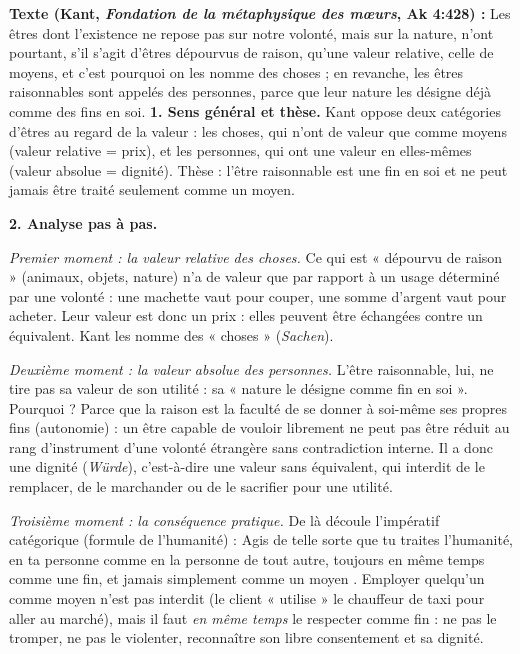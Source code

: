 \documentclass[11pt]{article}
\newcommand{\cle}[1]{{\popxbold\color{popdark}#1}}
\begin{document}
\begin{exoresolu}
\textbf{Texte (Kant, \emph{Fondation de la métaphysique des mœurs}, Ak 4:428) :} \guillemotleft Les êtres dont l'existence ne repose pas sur notre volonté, mais sur la nature, n'ont pourtant, s'il s'agit d'êtres dépourvus de raison, qu'une valeur relative, celle de moyens, et c'est pourquoi on les nomme des choses ; en revanche, les êtres raisonnables sont appelés des personnes, parce que leur nature les désigne déjà comme des fins en soi. \guillemotright
\tcblower
\textbf{1. Sens général et thèse.} Kant oppose deux catégories d'êtres au regard de la valeur : les choses, qui n'ont de valeur que comme moyens (valeur relative = prix), et les personnes, qui ont une valeur en elles-mêmes (valeur absolue = dignité). Thèse : l'être raisonnable est une fin en soi et ne peut jamais être traité seulement comme un moyen.

\textbf{2. Analyse pas à pas.}

\emph{Premier moment : la valeur relative des choses.} Ce qui est « dépourvu de raison » (animaux, objets, nature) n'a de valeur que par rapport à un usage déterminé par une volonté : une machette vaut pour couper, une somme d'argent vaut pour acheter. Leur valeur est donc un \cle{prix} : elles peuvent être échangées contre un équivalent. Kant les nomme des « choses » (\emph{Sachen}).

\emph{Deuxième moment : la valeur absolue des personnes.} L'être raisonnable, lui, ne tire pas sa valeur de son utilité : sa « nature le désigne comme fin en soi ». Pourquoi ? Parce que la raison est la faculté de se donner à soi-même ses propres fins (autonomie) : un être capable de vouloir librement ne peut pas être réduit au rang d'instrument d'une volonté étrangère sans contradiction interne. Il a donc une \cle{dignité} (\emph{Würde}), c'est-à-dire une valeur sans équivalent, qui interdit de le remplacer, de le marchander ou de le sacrifier pour une utilité.

\emph{Troisième moment : la conséquence pratique.} De là découle l'impératif catégorique (formule de l'humanité) : \guillemotleft Agis de telle sorte que tu traites l'humanité, en ta personne comme en la personne de tout autre, toujours en même temps comme une fin, et jamais simplement comme un moyen \guillemotright. Employer quelqu'un comme moyen n'est pas interdit (le client « utilise » le chauffeur de taxi pour aller au marché), mais il faut \emph{en même temps} le respecter comme fin : ne pas le tromper, ne pas le violenter, reconnaître son libre consentement et sa dignité.


\end{exoresolu}
\end{document}

